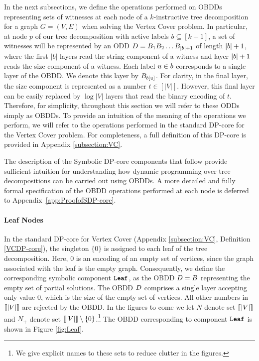 In the next subsections, we define the operations performed on OBDDs representing sets of witnesses at each node of a $k$-instructive tree decomposition for a graph $G = (V,E)$ when solving the {\sc Vertex Cover} problem.
In particular, at node $p$ of our tree decomposition with active labels $b\subseteq [k+1]$, a set of witnesses will be represented by an ODD $D = B_1B_2\ldots B_{|b|+1}$ of length $|b|+1$, where the first $|b|$ layers read the string component of a witness and layer $|b|+1$ reads the size component of a witness. Each label $u\in b$ corresponds to a single layer of the OBDD. We denote this layer by $B_{b[u]}$. For clarity, in the final layer, the size component is represented as a number $t\in [|V|]$. However, this final layer can be easily replaced by $\log |V|$ layers that read the binary encoding of $t$. Therefore, for simplicity, throughout this section we will refer to these ODDs simply as OBDDs. 
To provide an intuition of the meaning of the operations we perform, we will refer to the operations performed in the standard DP-core for the {\sc Vertex Cover} problem. For completeness, a full definition of this DP-core is provided in Appendix \ref{subsection:VC}.

The description of the Symbolic DP-core components that follow provide sufficient intuition for understanding how dynamic programming over tree decompositions can be carried out using OBDDs. A more detailed and fully formal specification of the OBDD operations performed at each node is deferred to Appendix~\ref{app:ProofofSDP-core}.

\paragraph*{Leaf Nodes}

In the standard DP-core for {\sc Vertex Cover} (Appendix \ref{subsection:VC}, Definition \ref{VCDP-core}), the singleton $\{0\}$ is assigned to each leaf of the tree decomposition. Here, $0$ is an encoding of an empty set of vertices, since the graph associated with the leaf is the empty graph. Consequently, we define the corresponding symbolic component $\texttt{\textbf{Leaf}}$, as the OBDD $D = B$ representing the empty set of partial solutions. The OBDD $D$ comprises a single layer accepting only value $0$, which is the size of the empty set of vertices. All other numbers in $\llbracket |V| \rrbracket$ are rejected by the OBDD. In the figures to come we let $N$ denote set $\llbracket |V| \rrbracket$ and $N_+$ denote set $\llbracket |V| \rrbracket\setminus \{0\}$.\footnote{We give explicit names to these sets to reduce clutter in the figures. } The OBDD corresponding to component $\texttt{\textbf{Leaf}}$ is shown in Figure \ref{fig:Leaf}.


